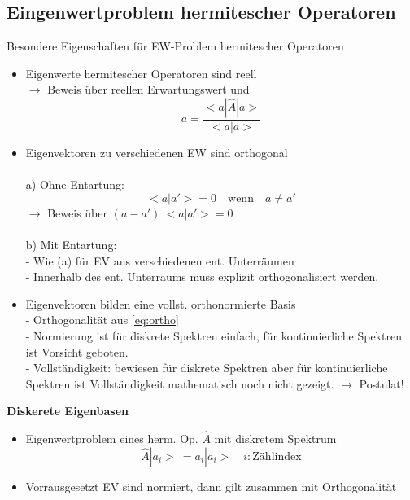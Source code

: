\documentclass[10pt,article,colorback,accentcolor=tud9d]{scrartcl}
\begin{document}
\begin{fleqn}
\subsection{Eingenwertproblem hermitescher Operatoren}
Besondere Eigenschaften für EW-Problem hermitescher Operatoren
  \begin{itemize}
    \item Eigenwerte hermitescher Operatoren sind reell\\
      $\rightarrow$ Beweis über reellen Erwartungswert und 
      \begin{equation}
      a=\frac{<a\left.\right|\hat{A}\left.\right|a>}{<a\left.\right|a>}
      \end{equation}
    \item Eigenvektoren zu verschiedenen EW sind orthogonal\\ \\
      a) Ohne Entartung:
         \begin{equation}
        \label{eq:ortho}
          <a\left.\right|a'> = 0 \quad \text{wenn} \quad a \neq a'
          \end{equation}
          $\rightarrow$ Beweis über $(a-a') \ <a\left.\right|a'> = 0$\\ \\
      b) Mit Entartung:\\
         - Wie (a) für EV aus verschiedenen ent. Unterräumen\\
         - Innerhalb des ent. Unterraums muss explizit orthogonalisiert werden.
    \item Eigenvektoren bilden eine vollst. orthonormierte Basis\\
      - Orthogonalität aus \ref{eq:ortho}\\
      - Normierung ist für diskrete Spektren einfach, für kontinuierliche Spektren ist Vorsicht geboten.\\
      - Vollständigkeit: bewiesen für diskrete Spektren aber für kontinuierliche Spektren ist Vollständigkeit mathematisch noch nicht gezeigt. $\rightarrow$ Postulat!
  \end{itemize}
\textbf{Diskerete Eigenbasen}
\begin{itemize}
  \item Eigenwertproblem eines herm. Op. $\hat{A}$ mit diskretem Spektrum
    \begin{equation}
    \hat{A}\left.\right|a_i> \ = a_i\left.\right|a_i> \quad i:\text{Zählindex}
    \end{equation}
  \item Vorrausgesetzt EV sind normiert, dann gilt zusammen mit Orthogonalität 

\end{itemize}
\end{fleqn}
\end{document}
